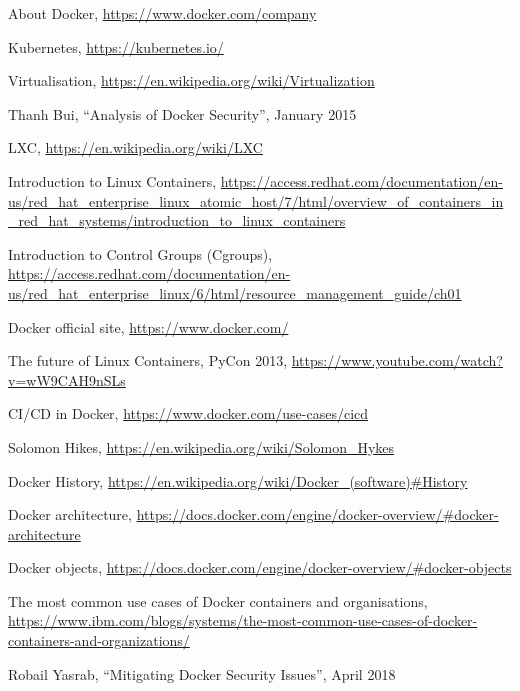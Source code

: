 \documentclass[a4paper,12pt]{article}
\begin{document}
\newpage

\begin{thebibliography}{99}

About Docker, \url{https://www.docker.com/company}

Kubernetes, \url{https://kubernetes.io/}

Virtualisation,
\url{https://en.wikipedia.org/wiki/Virtualization}

Thanh Bui, ``Analysis of Docker Security'', January 2015

LXC, \url{https://en.wikipedia.org/wiki/LXC}

Introduction to Linux Containers,
\url{https://access.redhat.com/documentation/en-us/red_hat_enterprise_linux_atomic_host/7/html/overview_of_containers_in_red_hat_systems/introduction_to_linux_containers}
  
Introduction to Control Groups (Cgroups),
\url{https://access.redhat.com/documentation/en-us/red_hat_enterprise_linux/6/html/resource_management_guide/ch01}

Docker official site, \url{https://www.docker.com/}

The future of Linux Containers, PyCon 2013,
\url{https://www.youtube.com/watch?v=wW9CAH9nSLs}

CI/CD in Docker, \url{https://www.docker.com/use-cases/cicd}

Solomon Hikes,
\url{https://en.wikipedia.org/wiki/Solomon_Hykes}

Docker History,
\url{https://en.wikipedia.org/wiki/Docker_(software)#History}

Docker architecture,
\url{https://docs.docker.com/engine/docker-overview/#docker-architecture}

Docker objects,
\url{https://docs.docker.com/engine/docker-overview/#docker-objects}

The most common use cases of Docker containers and organisations,
\url{https://www.ibm.com/blogs/systems/the-most-common-use-cases-of-docker-containers-and-organizations/}

Robail Yasrab, ``Mitigating Docker Security Issues'', April 2018


\end{thebibliography}
\end{document}
